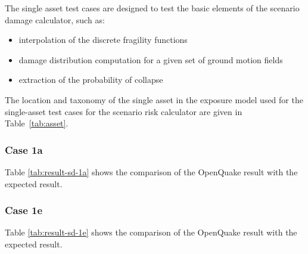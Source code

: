 The single asset test cases are designed to test the basic elements of the scenario damage calculator, such as:

\begin{itemize}
\item interpolation of the discrete fragility functions
\item damage distribution computation for a given set of ground motion fields
\item extraction of the probability of collapse
\end{itemize}

The location and taxonomy of the single asset in the exposure model used for the single-asset test cases for the scenario risk calculator are given in Table~\ref{tab:asset}.

\subsubsection{Case 1a}


Table \ref{tab:result-sd-1a} shows the comparison of the OpenQuake result with the expected result.


\subsubsection{Case 1e}


Table \ref{tab:result-sd-1e} shows the comparison of the OpenQuake result with the expected result.